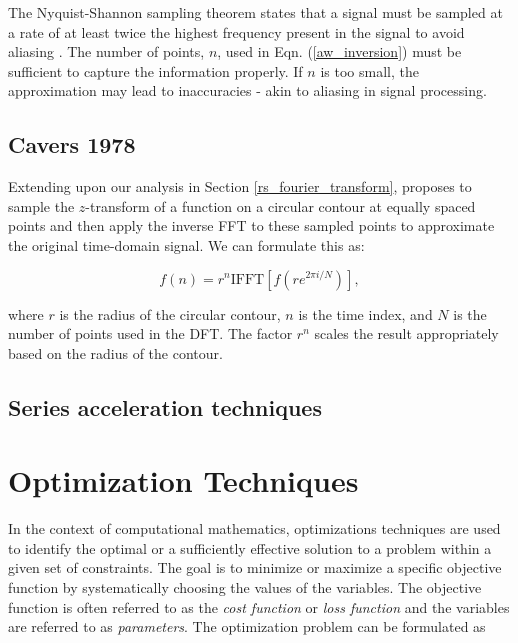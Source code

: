 \documentclass[a4paper]{report}
\begin{document}
The Nyquist-Shannon sampling theorem states that a signal must be sampled at a rate of at least twice the highest frequency present in the signal to avoid aliasing \citep{shannon1949communication,nyquist1928certain}. The number of points, $n$, used in Eqn. (\ref{aw_inversion}) must be sufficient to capture the information properly. If $n$ is too small, the approximation may lead to inaccuracies - akin to aliasing in signal processing.

\subsection{Cavers 1978}\label{cavers_section}
Extending upon our analysis in Section \ref{rs_fourier_transform}, \citet{Cavers1978FFT} proposes to sample the $z$-transform of a function on a circular contour at equally spaced points and then apply the inverse FFT to these sampled points to approximate the original time-domain signal. We can formulate this as:

\begin{equation}\label{cavers}
	f(n) = r^n \text{IFFT}[f(re^{2\pi i / N})],
\end{equation}

where $r$ is the radius of the circular contour, $n$ is the time index, and $N$ is the number of points used in the DFT. The factor $r^n$ scales the result appropriately based on the radius of the contour.

\subsection{Series acceleration techniques}

\section{Optimization Techniques}
In the context of computational mathematics, optimizations techniques are used to identify the optimal or a sufficiently effective solution to a problem within a given set of constraints. The goal is to minimize or maximize a specific objective function by systematically choosing the values of the variables. The objective function is often referred to as the \textit{cost function} or \textit{loss function} and the variables are referred to as \textit{parameters}. The optimization problem can be formulated as
\end{document}
